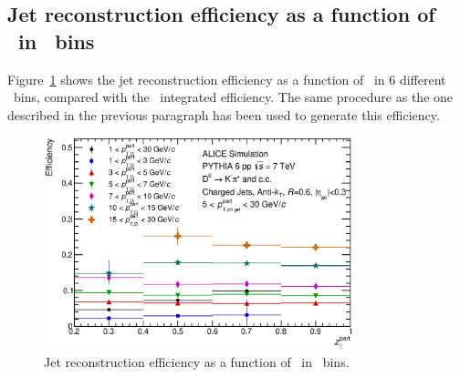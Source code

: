 \subsection{Jet reconstruction efficiency as a function of \zpargen\ in \ptdgen\ bins}
Figure~\ref{fig:D0_Full_R060_Efficiency_Z_Vs_DPt} shows the jet reconstruction efficiency as a function of \zpargen\ in 6 different \ptdgen\ bins,
compared with the \ptdgen\ integrated efficiency. The same procedure as the one described in the previous paragraph has been used to generate
this efficiency.
\begin{figure}[tbh]
\begin{center}
\includegraphics[width=0.8\textwidth]{img/D0_Full_R060_Efficiency_Z_Vs_DPt}
 \caption{Jet reconstruction efficiency as a function of \zpargen\ in \ptdgen\ bins.} 
 \label{fig:D0_Full_R060_Efficiency_Z_Vs_DPt}
\end{center}
\end{figure}
